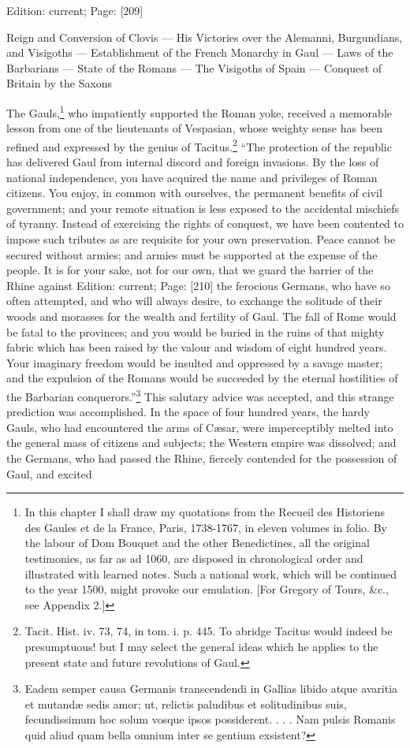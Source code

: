 Edition: current; Page: [209]


Reign and Conversion of Clovis \texthebrew{—} His Victories over the Alemanni, Burgundians, and Visigoths \texthebrew{—} Establishment of the French Monarchy in Gaul \texthebrew{—} Laws of the Barbarians \texthebrew{—} State of the Romans \texthebrew{—} The Visigoths of Spain \texthebrew{—} Conquest of Britain by the Saxons

The Gauls,\footnote{In this chapter I shall draw my quotations from the Recueil des Historiens des Gaules et de la France, Paris, 1738-1767, in eleven volumes in folio. By the labour of Dom Bouquet and the other Benedictines, all the original testimonies, as far as ad 1060, are disposed in chronological order and illustrated with learned notes. Such a national work, which will be continued to the year 1500, might provoke our emulation. [For Gregory of Tours, \&c., see Appendix 2.]} who impatiently supported the Roman yoke, received a memorable lesson from one of the lieutenants of Vespasian, whose weighty sense has been refined and expressed by the genius of Tacitus.\footnote{Tacit. Hist. iv. 73, 74, in tom. i. p. 445. To abridge Tacitus would indeed be presumptuous! but I may select the general ideas which he applies to the present state and future revolutions of Gaul.} \texthebrew{“}The protection of the republic has delivered Gaul from internal discord and foreign invasions. By the loss of national independence, you have acquired the name and privileges of Roman citizens. You enjoy, in common with ourselves, the permanent benefits of civil government; and your remote situation is less exposed to the accidental mischiefs of tyranny. Instead of exercising the rights of conquest, we have been contented to impose such tributes as are requisite for your own preservation. Peace cannot be secured without armies; and armies must be supported at the expense of the people. It is for your sake, not for our own, that we guard the barrier of the Rhine against Edition: current; Page: [210] the ferocious Germans, who have so often attempted, and who will always desire, to exchange the solitude of their woods and morasses for the wealth and fertility of Gaul. The fall of Rome would be fatal to the provinces; and you would be buried in the ruins of that mighty fabric which has been raised by the valour and wisdom of eight hundred years. Your imaginary freedom would be insulted and oppressed by a savage master; and the expulsion of the Romans would be succeeded by the eternal hostilities of the Barbarian conquerors.\texthebrew{}”\footnote{Eadem semper causa Germanis transcendendi in Gallias libido atque avaritia et mutandæ sedis amor; ut, relictis paludibus et solitudinibus suis, fecundissimum hoc solum vosque ipsos possiderent. . . . Nam pulsis Romanis quid aliud quam bella omnium inter se gentium exsistent?} This salutary advice was accepted, and this strange prediction was accomplished. In the space of four hundred years, the hardy Gauls, who had encountered the arms of Cæsar, were imperceptibly melted into the general mass of citizens and subjects; the Western empire was dissolved; and the Germans, who had passed the Rhine, fiercely contended for the possession of Gaul, and excited 